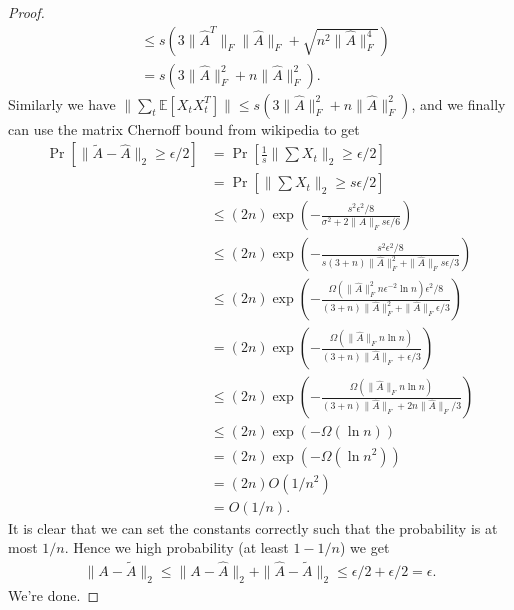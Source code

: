 \documentclass[11pt]{article}
\begin{document}
\begin{proof}
\begin{align*}
&\le s\left(3\|\widehat{A}^T\|_F\|\widehat{A}\|_F + \sqrt{n^2 \|\widehat{A}\|_F^4}\right)\\
&= s\left(3\|\widehat{A}\|_F^2 + n\|\widehat{A}\|_F^2\right).
\end{align*}
Similarly we have $\|\sum_t \mathbb{E}[X_tX_t^T]\| \le s\left(3\|\widehat{A}\|_F^2 + n \|\widehat{A}\|_F^2\right)$, and we finally can use the matrix Chernoff bound from wikipedia to get
\begin{align*}
    \Pr[\| \widetilde{A} - \widehat{A}\|_2 \ge \epsilon/2] &= \Pr[\frac{1}{s}\|\sum X_t\|_2 \ge \epsilon/2]\\
    &= \Pr[\| \sum X_t\|_2 \ge s\epsilon/2]\\
    &\le (2n) \exp\left(- \frac{s^2\epsilon^2/8}{\sigma^2 + 2\|A\|_F s \epsilon/6}\right)\\
    &\le (2n) \exp\left(- \frac{s^2\epsilon^2/8}{s(3+n)\|\widehat{A}\|_F^2 + \|\widehat{A}\|_F s\epsilon/3}\right)\\
    &\le (2n) \exp\left( - \frac{\Omega(\|\widehat{A}\|_F^2 n \epsilon^{-2} \ln n)\epsilon^2/8}{(3 + n)\|\widehat{A}\|_F^2 + \|\widehat{A}\|_F \epsilon/3}\right)\\
    &= (2n) \exp\left( - \frac{\Omega(\|\widehat{A}\|_F n\ln n)}{(3 + n)\|\widehat{A}\|_F + \epsilon/3}\right)\\
    &\le (2n) \exp\left( - \frac{\Omega(\|\widehat{A}\|_F n\ln n)}{(3 + n)\|\widehat{A}\|_F + 2n\|\widehat{A}\|_F/3}\right)\\
    &\le (2n) \exp\left( - \Omega(\ln n)\right)\\
    &= (2n)\exp\left(- \Omega(\ln n^2)\right)\\
    &= (2n)O(1/n^2)\\
    &= O(1/n).
\end{align*}
It is clear that we can set the constants correctly such that the probability is at most $1/n$. Hence we high probability (at least $1 - 1/n$) we get
\begin{align*}
    \|A - \widetilde{A}\|_2 \le \|A - \widehat{A}\|_2 + \|\widehat{A} - \widetilde{A}\|_2 \le \epsilon/2 + \epsilon/2 = \epsilon.
\end{align*}
We're done.
\end{proof}
\end{document}
